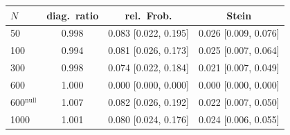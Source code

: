 \begin{tabular}{lccc}
\toprule
$N$ & diag.\ ratio & rel.\ Frob. & Stein \\
\midrule
50 & 0.998 & 0.083 [0.022, 0.195] & 0.026 [0.009, 0.076] \\
100 & 0.994 & 0.081 [0.026, 0.173] & 0.025 [0.007, 0.064] \\
300 & 0.998 & 0.074 [0.022, 0.184] & 0.021 [0.007, 0.049] \\
600 & 1.000 & 0.000 [0.000, 0.000] & 0.000 [0.000, 0.000] \\
600$^{\mathrm{null}}$ & 1.007 & 0.082 [0.026, 0.192] & 0.022 [0.007, 0.050] \\
1000 & 1.001 & 0.080 [0.024, 0.176] & 0.024 [0.006, 0.055] \\
\bottomrule
\end{tabular}
